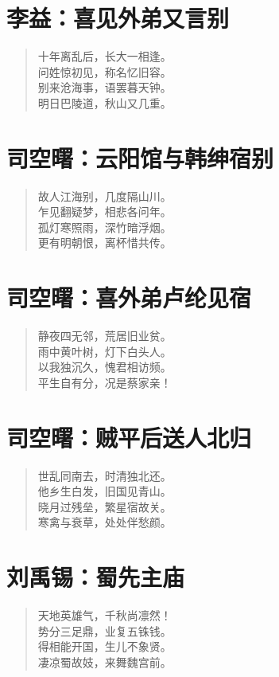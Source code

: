 \documentclass[12pt,oneside]{book}
\newenvironment{shici}{%
\begin{verse}\centering\yanti\large\hspace{12pt}}{\end{verse}}
\begin{document}
\begin{common-format}
\chapter{李益：喜见外弟又言别}
\begin{shici}
十年离乱后，长大一相逢。\\
问姓惊初见，称名忆旧容。\\
别来沧海事，语罢暮天钟。\\
明日巴陵道，秋山又几重。
\end{shici}

\chapter{司空曙：云阳馆与韩绅宿别}
\begin{shici}
故人江海别，几度隔山川。\\
乍见翻疑梦，相悲各问年。\\
孤灯寒照雨，深竹暗浮烟。\\
更有明朝恨，离杯惜共传。
\end{shici}

\chapter{司空曙：喜外弟卢纶见宿}
\begin{shici}
静夜四无邻，荒居旧业贫。\\
雨中黄叶树，灯下白头人。\\
以我独沉久，愧君相访频。\\
平生自有分，况是蔡家亲！
\end{shici}

\chapter{司空曙：贼平后送人北归}
\begin{shici}
世乱同南去，时清独北还。\\
他乡生白发，旧国见青山。\\
晓月过残垒，繁星宿故关。\\
寒禽与衰草，处处伴愁颜。
\end{shici}

\chapter{刘禹锡：蜀先主庙}
\begin{shici}
天地英雄气，千秋尚凛然！\\
势分三足鼎，业复五铢钱。\\
得相能开国，生儿不象贤。\\
凄凉蜀故妓，来舞魏宫前。
\end{shici}


\end{common-format}
\end{document}
